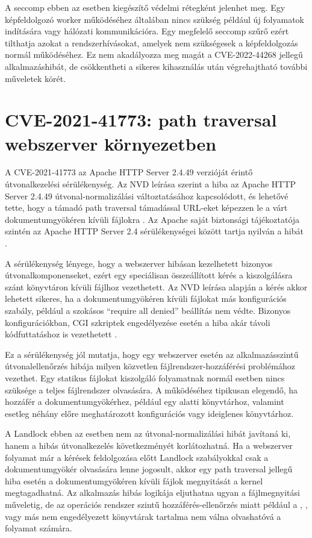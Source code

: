 A seccomp ebben az esetben kiegészítő védelmi rétegként jelenhet meg. Egy
képfeldolgozó worker működéséhez általában nincs szükség például új folyamatok
indítására vagy hálózati kommunikációra. Egy megfelelő seccomp szűrő ezért
tilthatja azokat a rendszerhívásokat, amelyek nem szükségesek a képfeldolgozás
normál működéséhez. Ez nem akadályozza meg magát a CVE-2022-44268 jellegű
alkalmazáshibát, de csökkentheti a sikeres kihasználás után végrehajtható
további műveletek körét.

\section{CVE-2021-41773: path traversal webszerver környezetben}

A CVE-2021-41773 az Apache HTTP Server 2.4.49 verzióját érintő
útvonalkezelési sérülékenység. Az NVD leírása szerint a hiba az Apache HTTP
Server 2.4.49 útvonal-normalizálási változtatásához kapcsolódott, és lehetővé
tette, hogy a támadó path traversal támadással URL-eket képezzen le a várt
dokumentumgyökéren kívüli fájlokra \cite{nvd-cve-2021-41773}. Az Apache saját
biztonsági tájékoztatója szintén az Apache HTTP Server 2.4 sérülékenységei
között tartja nyilván a hibát \cite{apache-httpd-vulnerabilities-24}.

A sérülékenység lényege, hogy a webszerver hibásan kezelhetett bizonyos
útvonalkomponenseket, ezért egy speciálisan összeállított kérés a kiszolgálásra
szánt könyvtáron kívüli fájlhoz vezethetett. Az NVD leírása alapján a kérés
akkor lehetett sikeres, ha a dokumentumgyökéren kívüli fájlokat más
konfigurációs szabály, például a szokásos ``require
all denied'' beállítás nem védte. Bizonyos konfigurációkban, CGI szkriptek
engedélyezése esetén a hiba akár távoli kódfuttatáshoz is vezethetett
\cite{nvd-cve-2021-41773}.

Ez a sérülékenység jól mutatja, hogy egy webszerver esetén az alkalmazásszintű
útvonalellenőrzés hibája milyen közvetlen fájlrendszer-hozzáférési problémához
vezethet. Egy statikus fájlokat kiszolgáló folyamatnak normál esetben nincs
szüksége a teljes fájlrendszer olvasására. A működéséhez tipikusan elegendő,
ha hozzáfér a dokumentumgyökérhez, például egy  alatti
könyvtárhoz, valamint esetleg néhány előre meghatározott konfigurációs vagy
ideiglenes könyvtárhoz.

A Landlock ebben az esetben nem az útvonal-normalizálási hibát javítaná ki,
hanem a hibás útvonalkezelés következményét korlátozhatná. Ha a webszerver
folyamat már a kérések feldolgozása előtt Landlock szabályokkal csak a
dokumentumgyökér olvasására lenne jogosult, akkor egy path traversal jellegű
hiba esetén a dokumentumgyökéren kívüli fájlok megnyitását a kernel
megtagadhatná. Az alkalmazás hibás logikája eljuthatna ugyan a fájlmegnyitási
műveletig, de az operációs rendszer szintű hozzáférés-ellenőrzés miatt például
a , , vagy más nem engedélyezett könyvtárak tartalma nem
válna olvashatóvá a folyamat számára.

